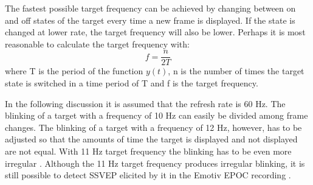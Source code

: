 The fastest possible target frequency can be achieved by changing between on and off states of the target every time a new frame is displayed. If the state is changed at lower rate, the target frequency will also be lower. Perhaps it is most reasonable to calculate the target frequency with:
\begin{equation}
	f = \frac{n}{2T}
\end{equation}
where T is the period of the function $y(t)$, n is the number of times the target state is switched in a time period of T and f is the target frequency.

In the following discussion it is assumed that the refresh rate is 60 Hz. The blinking of a target with a frequency of 10 Hz can easily be divided among frame changes. The blinking of a target with a frequency of 12 Hz, however, has to be adjusted so that the amounts of time the target is displayed and not displayed are not equal. With 11 Hz target frequency the blinking has to be even more irregular \cite{11hz}. Although the 11 Hz target frequency produces irregular blinking, it is still possible to detect \gls{SSVEP} elicited by it in the Emotiv EPOC recording \cite{emotiv_11hz}.


